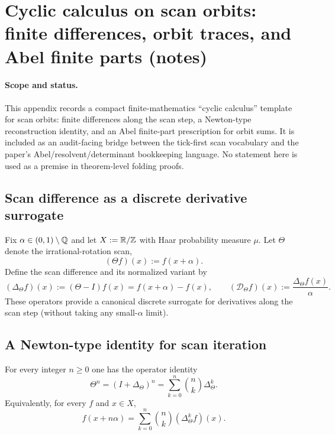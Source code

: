 \section{Cyclic calculus on scan orbits: finite differences, orbit traces, and Abel finite parts (notes)}
\label{app:cyclic_calculus_theta_fp}

\paragraph{Scope and status.}
\AuditTag This appendix records a compact finite-mathematics ``cyclic calculus'' template for scan orbits:
finite differences along the scan step, a Newton-type reconstruction identity, and an Abel finite-part prescription for orbit sums.
It is included as an audit-facing bridge between the tick-first scan vocabulary and the paper's Abel/resolvent/determinant bookkeeping language.
No statement here is used as a premise in theorem-level folding proofs.

\subsection{Scan difference as a discrete derivative surrogate}
\label{subsec:cyclic_calculus_difference}

\MathTag Fix $\alpha\in(0,1)\setminus\mathbb{Q}$ and let $X:=\mathbb{R}/\mathbb{Z}$ with Haar probability measure $\mu$.
Let $\Theta$ denote the irrational-rotation scan,
\[
(\Theta f)(x):=f(x+\alpha).
\]
Define the scan difference and its normalized variant by
\[
(\Delta_\Theta f)(x):=(\Theta-I)f(x)=f(x+\alpha)-f(x),
\qquad
(\mathcal{D}_\Theta f)(x):=\frac{\Delta_\Theta f(x)}{\alpha}.
\]
These operators provide a canonical discrete surrogate for derivatives along the scan step (without taking any small-$\alpha$ limit).

\subsection{A Newton-type identity for scan iteration}
\label{subsec:cyclic_calculus_newton}

\begin{proposition}\label{prop:cyclic_binomial_scan_expansion}
\MathTag For every integer $n\ge 0$ one has the operator identity
\[
\Theta^n=(I+\Delta_\Theta)^n=\sum_{k=0}^{n}\binom{n}{k}\Delta_\Theta^k.
\]
Equivalently, for every $f$ and $x\in X$,
\[
f(x+n\alpha)=\sum_{k=0}^{n}\binom{n}{k}(\Delta_\Theta^k f)(x).
\]
\end{proposition}

